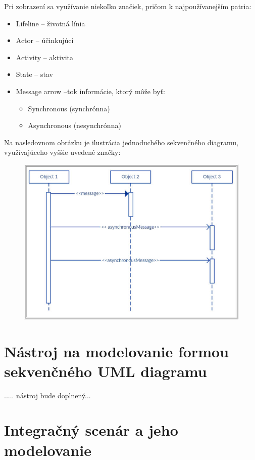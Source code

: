 \documentclass[10pt,twoside,slovak,a4paper]{article}
\begin{document}
Pri zobrazení sa využívanie niekoľko značiek, pričom k najpoužívanejším patria:
\begin{itemize}
	\item Lifeline – životná línia
	\item Actor – účinkujúci
	\item Activity – aktivita
	\item State – stav
	\item Message arrow –tok informácie, ktorý môže byť:
		\begin{itemize}
		\item Synchronous (synchrónna)
		\item Asynchronous (nesynchrónna)
		\end{itemize}
\end{itemize}

Na nasledovnom obrázku je ilustrácia jednoduchého sekvenčného diagramu, využívajúceho vyššie uvedené značky\cite{SDT}:
\begin{figure}[h]
\centering
\includegraphics[width=\textwidth]{Images/Obr2.jpg}
\end{figure}


\newpage
\section{Nástroj na modelovanie formou sekvenčného UML diagramu} \label{4sek}

..... nástroj bude doplnený...

\section{Integračný scenár a jeho modelovanie} \label{5sek}
\end{document}
